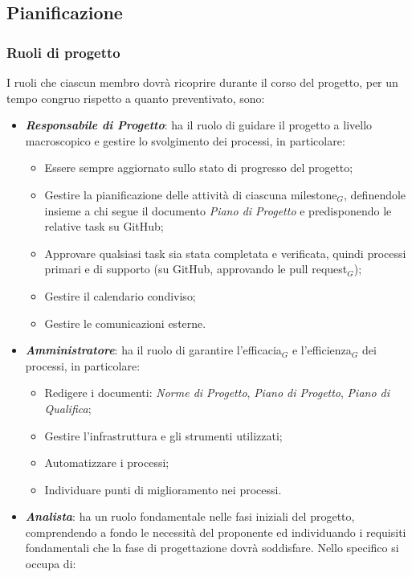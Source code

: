 \subsection{Pianificazione}

\subsubsection{Ruoli di progetto}
I ruoli che ciascun membro dovrà ricoprire durante il corso del progetto, per un tempo congruo rispetto a quanto preventivato, sono:
\begin{itemize}
  \item \textbf{\textit{Responsabile di Progetto}}: ha il ruolo di guidare il progetto a livello macroscopico e gestire lo svolgimento dei processi, in particolare:
  \begin{itemize}
    \item Essere sempre aggiornato sullo stato di progresso del progetto;
    \item Gestire la pianificazione delle attività di ciascuna milestone$_G$, definendole insieme a chi segue il documento \textit{Piano di Progetto} e predisponendo le relative task su GitHub;
    \item Approvare qualsiasi task sia stata completata e verificata, quindi processi primari e di supporto (su GitHub, approvando le pull request$_G$);
    \item Gestire il calendario condiviso;
    \item Gestire le comunicazioni esterne.
  \end{itemize}
  \item \textbf{\textit{Amministratore}}: ha il ruolo di garantire l'efficacia$_G$ e l'efficienza$_G$ dei processi, in particolare:
  \begin{itemize}
    \item Redigere i documenti: \textit{Norme di Progetto}, \textit{Piano di Progetto}, \textit{Piano di Qualifica};
    \item Gestire l'infrastruttura e gli strumenti utilizzati;
    \item Automatizzare i processi;
    \item Individuare punti di miglioramento nei processi.
  \end{itemize}
  \item \textbf{\textit{Analista}}: ha un ruolo fondamentale nelle fasi iniziali del progetto, comprendendo a fondo le necessità del proponente ed individuando i requisiti fondamentali che la fase di progettazione dovrà soddisfare. Nello specifico si occupa di:

\end{itemize}
